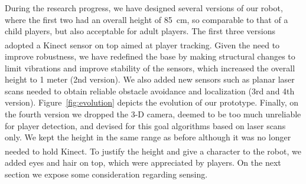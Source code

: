
During the research progress, we have designed several versions of our robot, where the first two had an overall height of 85~cm, so comparable to that of a child players, but also acceptable for adult players. The first three versions adopted a Kinect\textsuperscript{\textregistered} sensor on top aimed at player tracking. Given the need to improve robustness, we have redefined the base by making structural changes to limit vibrations and improve stability of the sensors, which increased the overall height to 1 meter (2nd version). We also added new sensors such as planar laser scans needed to obtain reliable obstacle avoidance and localization (3rd and 4th version). Figure~\ref{fig:evolution} depicts the evolution of our prototype. Finally, on the fourth version we dropped the 3-D camera, deemed to be too much unreliable for player detection, and devised for this goal algorithms based on laser scans only. We kept the height in the same range as before although it was no longer needed to hold Kinect\textsuperscript{\textregistered}. To justify the height and give a character to the robot, we added eyes and hair on top, which were appreciated by players. On the next section we expose some consideration regarding sensing.

